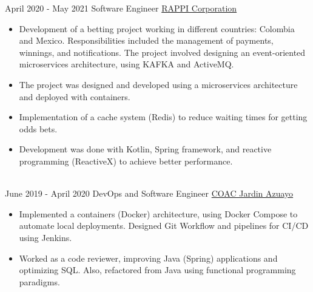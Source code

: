 \documentclass[letterpaper]{twentysecondcv} %
\begin{document}
\begin{twentyla} %
\twentyitem
    {April 2020 -}
    {May 2021}
    {Software Engineer}
    {\href{https://www.rappi.com.ec/}{RAPPI Corporation}}
    {}
    {
        \begin{itemize}
            \item Development of a betting project working in different countries: Colombia and Mexico. Responsibilities included the management of payments, winnings, and notifications. The project involved designing an event-oriented microservices architecture, using KAFKA and ActiveMQ.
         \end{itemize}

        \begin{itemize}
            \item The project was designed and developed using a microservices architecture and deployed with containers.
         \end{itemize}

        \begin{itemize}
            \item Implementation of a cache system (Redis) to reduce waiting times for getting odds bets.
         \end{itemize}

        \begin{itemize}
            \item Development was done with Kotlin, Spring framework, and reactive programming (ReactiveX) to achieve better performance.
         \end{itemize}
    }
    \\

\twentyitem
    {June 2019 -}
    {April 2020}
    {DevOps and Software Engineer}
    {\href{https://www.jardinazuayo.fin.ec/}{COAC Jardin Azuayo}}
    {}
    {
        \begin{itemize}
            \item Implemented a containers (Docker) architecture, using Docker Compose to automate local deployments. Designed Git Workflow and pipelines for CI/CD using Jenkins.
         \end{itemize}

        \begin{itemize}
            \item Worked as a code reviewer, improving Java (Spring) applications and optimizing SQL. Also, refactored from Java using functional programming paradigms.
         \end{itemize}

}
\end{twentyla}
\end{document}

